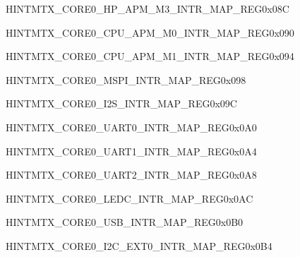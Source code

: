 \begin{register}{H}{INTMTX\_CORE0\_HP\_APM\_M3\_INTR\_MAP\_REG}{0x08C}\label{regdesc:INTMTXCORE0HPAPMM3INTRMAPREG} \end{register}\vspace{-3em}
\begin{register}{H}{INTMTX\_CORE0\_CPU\_APM\_M0\_INTR\_MAP\_REG}{0x090}\label{regdesc:INTMTXCORE0CPUAPMM0INTRMAPREG} \end{register}\vspace{-3em}
\begin{register}{H}{INTMTX\_CORE0\_CPU\_APM\_M1\_INTR\_MAP\_REG}{0x094}\label{regdesc:INTMTXCORE0CPUAPMM1INTRMAPREG} \end{register}\vspace{-3em}
\begin{register}{H}{INTMTX\_CORE0\_MSPI\_INTR\_MAP\_REG}{0x098}\label{regdesc:INTMTXCORE0MSPIINTRMAPREG} \end{register}\vspace{-3em}
\begin{register}{H}{INTMTX\_CORE0\_I2S\_INTR\_MAP\_REG}{0x09C}\label{regdesc:INTMTXCORE0I2SINTRMAPREG} \end{register}\vspace{-3em}
\begin{register}{H}{INTMTX\_CORE0\_UART0\_INTR\_MAP\_REG}{0x0A0}\label{regdesc:INTMTXCORE0UART0INTRMAPREG} \end{register}\vspace{-3em}
\begin{register}{H}{INTMTX\_CORE0\_UART1\_INTR\_MAP\_REG}{0x0A4}\label{regdesc:INTMTXCORE0UART1INTRMAPREG} \end{register}\vspace{-3em}
\begin{register}{H}{INTMTX\_CORE0\_UART2\_INTR\_MAP\_REG}{0x0A8}\label{regdesc:INTMTXCORE0UART2INTRMAPREG} \end{register}\vspace{-3em}
\begin{register}{H}{INTMTX\_CORE0\_LEDC\_INTR\_MAP\_REG}{0x0AC}\label{regdesc:INTMTXCORE0LEDCINTRMAPREG} \end{register}\vspace{-3em}
\begin{register}{H}{INTMTX\_CORE0\_USB\_INTR\_MAP\_REG}{0x0B0}\label{regdesc:INTMTXCORE0USBINTRMAPREG} \end{register}\vspace{-3em}
\begin{register}{H}{INTMTX\_CORE0\_I2C\_EXT0\_INTR\_MAP\_REG}{0x0B4}\label{regdesc:INTMTXCORE0I2CEXT0INTRMAPREG} \end{register}\vspace{-3em}
